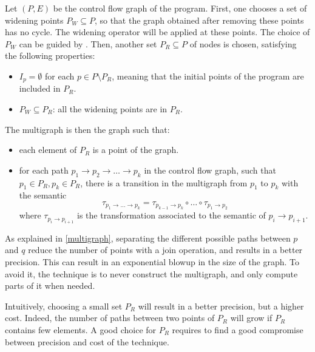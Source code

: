 \documentclass[a4paper,english,titlepage,11pt]{report}
\begin{document}
	Let $(P,E)$ be the control flow graph of the program.
	First, one chooses a set of widening points $P_W \subseteq P$, so that the graph
	obtained after removing these points has no cycle. The widening operator
	will be applied at these points. The choice of $P_W$ can be guided by
	\cite{Bou92}.
	Then, another set $P_R \subseteq P$ of nodes is chosen, satisfying the
	following properties:
	\begin{itemize}
	\item $I_p = \emptyset$ for each $p \in P \setminus P_R$, meaning that the initial
	points of the program are included in $P_R$.
	\item $P_W \subseteq P_R$: all the widening points are in $P_R$.
	\end{itemize} 

	The multigraph is then the graph such that:
	\begin{itemize}
	\item each element of $P_R$ is a point of the graph.
	\item for each path $p_1 \rightarrow p_2 \rightarrow \dots \rightarrow p_k$
	in the control flow graph, such that $p_1 \in P_R, p_k \in P_R$,
	there is a transition in the multigraph from $p_1$ to $p_k$ with the
	semantic $$\tau_{p_1 \rightarrow \dots \rightarrow p_k} = \tau_{p_{k-1}
	\rightarrow p_k} \circ
	\dots \circ \tau_{p_1 \rightarrow p_2}$$ where $\tau_{p_i \rightarrow
	p_{i+1}}$ is the transformation associated to the semantic of $p_i
	\rightarrow p_{i+1}$.
	\end{itemize}

	As explained in \ref{multigraph}, separating the different
	possible paths between $p$ and $q$ reduce the number of points with a join
	operation, and results in a better precision.
	This can result in an exponential blowup in the size of the graph. To avoid
	it, the technique is to never construct the multigraph, and only compute
	parts of it when needed.

	Intuitively, choosing a small set $P_R$ will result in a better precision,
	but a higher cost. 
	Indeed, the number of paths between two points of $P_R$ will grow if $P_R$
	contains few elements.
	A good choice for $P_R$ requires to find a good
	compromise between precision and cost of the technique.
\end{document}

